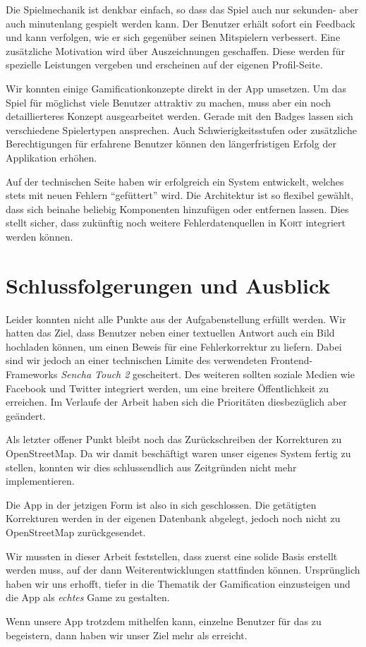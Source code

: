 Die Spielmechanik ist denkbar einfach, so dass das Spiel auch nur sekunden- aber auch  minutenlang gespielt werden kann.
Der Benutzer erhält sofort ein Feedback und kann verfolgen, wie er sich gegenüber seinen Mitspielern verbessert.
Eine zusätzliche Motivation wird über Auszeichnungen geschaffen.
Diese werden für spezielle Leistungen vergeben und erscheinen auf der eigenen Profil-Seite.

Wir konnten einige Gamificationkonzepte direkt in der App umsetzen.
Um das Spiel für möglichst viele Benutzer attraktiv zu machen, muss aber ein noch detaillierteres Konzept ausgearbeitet werden.
Gerade mit den Badges lassen sich verschiedene Spielertypen ansprechen.
Auch Schwierigkeitsstufen oder zusätzliche Berechtigungen für erfahrene Benutzer können den längerfristigen Erfolg der Applikation erhöhen.

Auf der technischen Seite haben wir erfolgreich ein System entwickelt, welches stets mit neuen Fehlern "`gefüttert"' wird.
Die Architektur ist so flexibel gewählt, dass sich beinahe beliebig Komponenten hinzufügen oder entfernen lassen.
Dies stellt sicher, dass zukünftig noch weitere Fehlerdatenquellen in \textsc{Kort} integriert werden können.

\section{Schlussfolgerungen und Ausblick}
Leider konnten nicht alle Punkte aus der Aufgabenstellung erfüllt werden.
Wir hatten das Ziel, dass Benutzer neben einer textuellen Antwort auch ein Bild hochladen können, um einen Beweis für eine Fehlerkorrektur zu liefern.
Dabei sind wir jedoch an einer technischen Limite des verwendeten Frontend-Frameworks \emph{Sencha Touch 2} gescheitert.
Des weiteren sollten soziale Medien wie Facebook und Twitter integriert werden, um eine breitere Öffentlichkeit zu erreichen.
Im Verlaufe der Arbeit haben sich die Prioritäten diesbezüglich aber geändert.

Als letzter offener Punkt bleibt noch das Zurückschreiben der Korrekturen zu \gls{OpenStreetMap}.
Da wir damit beschäftigt waren unser eigenes System fertig zu stellen, konnten wir dies schlussendlich aus Zeitgründen nicht mehr implementieren.

Die App in der jetzigen Form ist also in sich geschlossen. Die getätigten Korrekturen werden in der eigenen Datenbank abgelegt, jedoch noch nicht zu \gls{OpenStreetMap} zurückgesendet.

Wir mussten in dieser Arbeit feststellen, dass zuerst eine solide Basis erstellt werden muss, auf der dann Weiterentwicklungen stattfinden können.
Ursprünglich haben wir uns erhofft, tiefer in die Thematik der \gls{Gamification} einzusteigen und die App als \emph{echtes} Game zu gestalten.

Wenn unsere App trotzdem mithelfen kann, einzelne Benutzer für das  zu begeistern, dann haben wir unser  Ziel mehr als erreicht.
